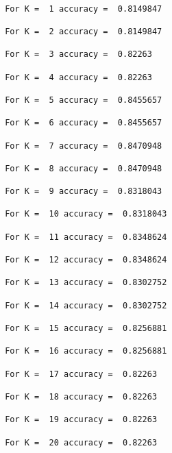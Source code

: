 \documentclass[11pt]{article}
\begin{document}
    \begin{Verbatim}[commandchars=\\\{\}]

 For K =  1 accuracy =  0.8149847 

 For K =  2 accuracy =  0.8149847 

 For K =  3 accuracy =  0.82263 

 For K =  4 accuracy =  0.82263 

 For K =  5 accuracy =  0.8455657 

 For K =  6 accuracy =  0.8455657 

 For K =  7 accuracy =  0.8470948 

 For K =  8 accuracy =  0.8470948 

 For K =  9 accuracy =  0.8318043 

 For K =  10 accuracy =  0.8318043 

 For K =  11 accuracy =  0.8348624 

 For K =  12 accuracy =  0.8348624 

 For K =  13 accuracy =  0.8302752 

 For K =  14 accuracy =  0.8302752 

 For K =  15 accuracy =  0.8256881 

 For K =  16 accuracy =  0.8256881 

 For K =  17 accuracy =  0.82263 

 For K =  18 accuracy =  0.82263 

 For K =  19 accuracy =  0.82263 

 For K =  20 accuracy =  0.82263 

    \end{Verbatim}


    
    
    
    
\end{document}
